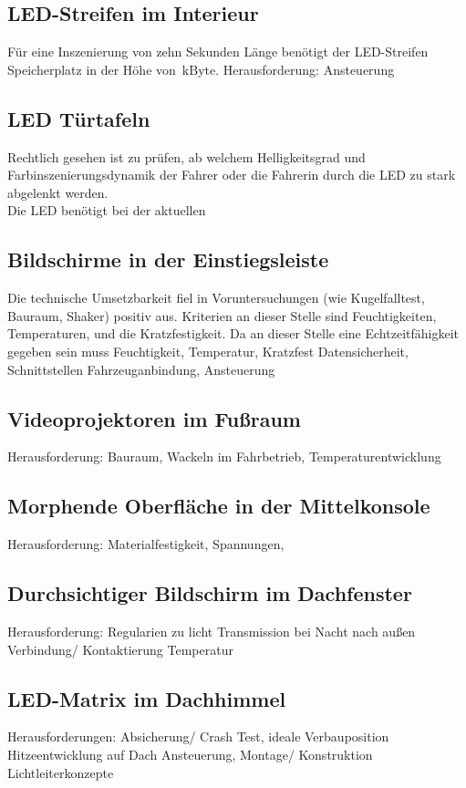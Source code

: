 \subsection{LED-Streifen im Interieur}
Für eine Inszenierung von zehn Sekunden Länge benötigt der LED-Streifen Speicherplatz in der Höhe von $ \,\mathrm{kByte}$.
Herausforderung:
Ansteuerung
\subsection{LED Türtafeln}
Rechtlich gesehen ist zu prüfen, ab welchem Helligkeitsgrad und Farbinszenierungsdynamik der Fahrer oder die Fahrerin durch die LED zu stark abgelenkt werden.\\
Die LED benötigt bei der aktuellen 
\subsection{Bildschirme in der Einstiegsleiste}

Die technische Umsetzbarkeit fiel in Voruntersuchungen (wie Kugelfalltest, Bauraum, Shaker) positiv aus.
Kriterien an dieser Stelle sind Feuchtigkeiten, Temperaturen, und die Kratzfestigkeit.
Da an dieser Stelle eine Echtzeitfähigkeit gegeben sein muss
Feuchtigkeit, Temperatur, Kratzfest
Datensicherheit, Schnittstellen
Fahrzeuganbindung, Ansteuerung

\subsection{Videoprojektoren im Fußraum}
Herausforderung:
Bauraum, Wackeln im Fahrbetrieb, Temperaturentwicklung
\subsection{Morphende Oberfläche in der Mittelkonsole}
Herausforderung:
Materialfestigkeit, Spannungen,

\subsection{Durchsichtiger Bildschirm im Dachfenster}
Herausforderung:
Regularien zu licht Transmission bei Nacht nach außen
Verbindung/ Kontaktierung
Temperatur
\subsection{LED-Matrix im Dachhimmel}
Herausforderungen:
Absicherung/ Crash Test, ideale Verbauposition
Hitzeentwicklung auf Dach
Ansteuerung, Montage/ Konstruktion
Lichtleiterkonzepte
